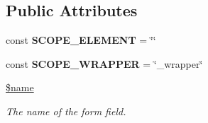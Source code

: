\subsection*{Public Attributes}
\begin{DoxyCompactItemize}
\item 
\hypertarget{class_element_a181e313e57524c90f62e139cb27a9d81}{
const {\bfseries SCOPE\_\-ELEMENT} = \char`\"{}\char`\"{}}
\label{class_element_a181e313e57524c90f62e139cb27a9d81}

\item 
\hypertarget{class_element_a27c7af5ccad0bd5e5ba2c41e2b326bb1}{
const {\bfseries SCOPE\_\-WRAPPER} = \char`\"{}\_\-wrapper\char`\"{}}
\label{class_element_a27c7af5ccad0bd5e5ba2c41e2b326bb1}

\item 
\hyperlink{class_element_a788f6a1a91ffca959c3f9c12dfdcd0fa}{\$name}
\begin{DoxyCompactList}\small\item\em The name of the form field. \item\end{DoxyCompactList}\end{DoxyCompactItemize}
